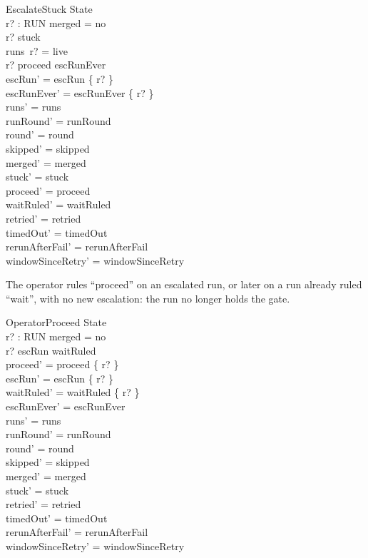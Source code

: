 \documentclass{article}
\begin{document}
\begin{schema}{EscalateStuck}
  \Delta State \\
  r? : RUN
\where
  merged = no \\
  r? \in stuck \\
  runs~r? = live \\
  r? \notin proceed \cup escRunEver \\
  escRun' = escRun \cup \{ r? \} \\
  escRunEver' = escRunEver \cup \{ r? \} \\
  runs' = runs \\
  runRound' = runRound \\
  round' = round \\
  skipped' = skipped \\
  merged' = merged \\
  stuck' = stuck \\
  proceed' = proceed \\
  waitRuled' = waitRuled \\
  retried' = retried \\
  timedOut' = timedOut \\
  rerunAfterFail' = rerunAfterFail \\
  windowSinceRetry' = windowSinceRetry
\end{schema}

The operator rules ``proceed'' on an escalated run, or later on a run already
ruled ``wait'', with no new escalation: the run no longer holds the gate.

\begin{schema}{OperatorProceed}
  \Delta State \\
  r? : RUN
\where
  merged = no \\
  r? \in escRun \cup waitRuled \\
  proceed' = proceed \cup \{ r? \} \\
  escRun' = escRun \setminus \{ r? \} \\
  waitRuled' = waitRuled \setminus \{ r? \} \\
  escRunEver' = escRunEver \\
  runs' = runs \\
  runRound' = runRound \\
  round' = round \\
  skipped' = skipped \\
  merged' = merged \\
  stuck' = stuck \\
  retried' = retried \\
  timedOut' = timedOut \\
  rerunAfterFail' = rerunAfterFail \\
  windowSinceRetry' = windowSinceRetry
\end{schema}
\end{document}
